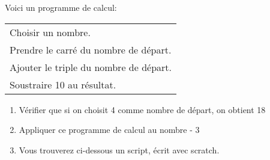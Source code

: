 
\medskip

\parbox{0.45\linewidth}{Voici un programme de calcul:}
\hfill
\parbox{0.45\linewidth}{\begin{tabular}{|l|}\hline
Choisir un nombre.\\
Prendre le carré du nombre de départ.\\
Ajouter le triple du nombre de départ.\\
Soustraire 10 au résultat.\\ \hline
\end{tabular}}

\medskip

\begin{enumerate}
\item Vérifier que si on choisit 4 comme nombre de départ, on obtient 18 
\item Appliquer ce programme de calcul au nombre - 3
\item Vous trouverez ci-dessous un script, écrit avec scratch.


\begin{scratch}
\end{scratch}

\medskip


\end{enumerate}
